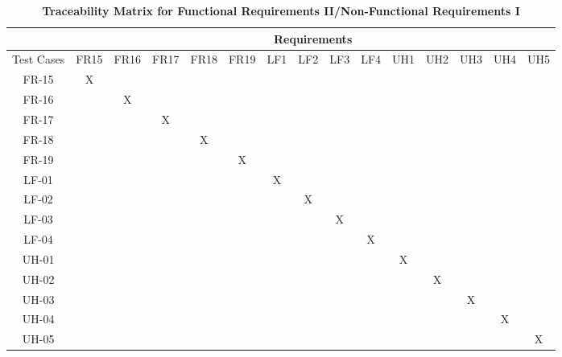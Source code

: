 \documentclass[12pt, titlepage]{article}
\begin{document}
\begin{landscape}
\begin{table}[h!]
\centering
\caption{\textbf{Traceability Matrix for Functional Requirements II/Non-Functional Requirements I}}
\label{tab:trace_matrix_02}
\begin{tabular}{|c|c|c|c|c|c|c|c|c|c|c|c|c|c|c|}
\hline
& \multicolumn{14}{c|}{Requirements} \\
\hline
Test Cases & FR15 & FR16 & FR17 & FR18 & FR19 & LF1 & LF2 & LF3 & LF4 & UH1 & UH2 & UH3 & UH4 & UH5 \\
\hline
FR-15 & X & & & & & & & & & & & & & \\
\hline
FR-16 & & X & & & & & & & & & & & & \\
\hline
FR-17 & & & X & & & & & & & & & & & \\
\hline
FR-18 & & & & X & & & & & & & & & & \\
\hline
FR-19 & & & & & X & & & & & & & & & \\
\hline
LF-01 & & & & & & X & & & & & & & & \\
\hline
LF-02 & & & & & & & X & & & & & & & \\
\hline
LF-03 & & & & & & & & X & & & & & & \\
\hline
LF-04 & & & & & & & & & X & & & & & \\
\hline
UH-01 & & & & & & & & & & X & & & & \\
\hline
UH-02 & & & & & & & & & & & X & & & \\
\hline
UH-03 & & & & & & & & & & & & X & & \\
\hline
UH-04 & & & & & & & & & & & & & X & \\
\hline
UH-05 & & & & & & & & & & & & & & X \\
\hline
\end{tabular}
\end{table}

\newpage


\end{landscape}
\end{document}
